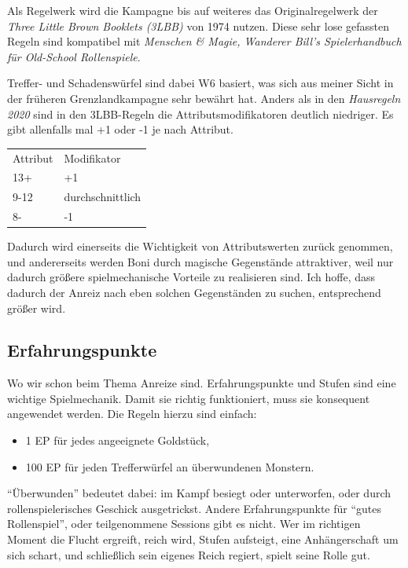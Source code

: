 \documentclass[11pt]{wbzine}
\begin{document}
\begin{multicols}{2}
    Als Regelwerk wird die Kampagne bis auf weiteres das
    Originalregelwerk der \textit{Three Little Brown Booklets
    (3LBB)} von 1974 nutzen.  Diese sehr lose gefassten Regeln sind
    kompatibel mit \textit{Menschen \& Magie, Wanderer Bill's
    Spielerhandbuch für Old-School Rollenspiele}. 

    Treffer- und Schadenswürfel sind dabei W6 basiert, was sich aus
    meiner Sicht in der früheren Grenzlandkampagne sehr bewährt hat.
    Anders als in den \textit{Hausregeln 2020} sind in den
    3LBB-Regeln die Attributsmodifikatoren deutlich niedriger. Es
    gibt allenfalls mal +1 oder -1 je nach Attribut. 

    \begin{tabularx}{\columnwidth}{YY}
	Attribut & Modifikator \\
	13+ & +1 \\
	9-12 & durchschnittlich \\
	8- & -1 \\
    \end{tabularx}

    Dadurch wird einerseits die Wichtigkeit von Attributswerten
    zurück genommen, und andererseits werden Boni durch magische
    Gegenstände attraktiver, weil nur dadurch größere
    spielmechanische Vorteile zu realisieren sind. Ich hoffe, dass
    dadurch der Anreiz nach eben solchen Gegenständen zu suchen,
    entsprechend größer wird.

    \subsection{Erfahrungspunkte}
    \label{xp}

    Wo wir schon beim Thema Anreize sind. Erfahrungspunkte und
    Stufen sind eine wichtige Spielmechanik. Damit sie richtig
    funktioniert, muss sie konsequent angewendet werden. Die Regeln
    hierzu sind einfach: 

    \begin{tcolorbox}
	\begin{itemize}
	    \item 1 EP für jedes angeeignete Goldstück, 

	\item 100 EP für jeden Trefferwürfel an überwundenen
	    Monstern.
	\end{itemize}
    \end{tcolorbox}

    ``Überwunden'' bedeutet dabei: im Kampf besiegt oder
    unterworfen, oder durch rollenspielerisches Geschick
    ausgetrickst. Andere Erfahrungspunkte für ``gutes Rollenspiel'',
    oder teilgenommene Sessions gibt es nicht. Wer im richtigen
    Moment die Flucht ergreift, reich wird, Stufen aufsteigt, eine
    Anhängerschaft um sich schart, und schließlich sein eigenes
    Reich regiert, spielt seine Rolle gut.


\end{multicols}
\end{document}
